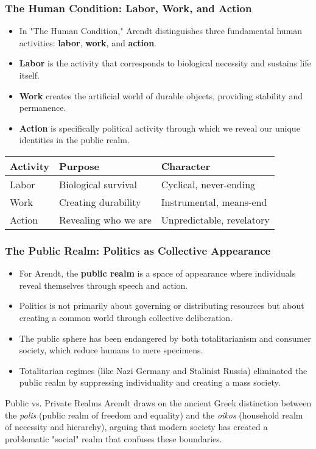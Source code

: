 \documentclass{beamer}
\begin{document}
\begin{frame}
\frametitle{The Human Condition: Labor, Work, and Action}
\begin{itemize}
    \item In "The Human Condition," Arendt distinguishes three fundamental human activities: \textbf{labor}, \textbf{work}, and \textbf{action}.
    \item \textbf{Labor} is the activity that corresponds to biological necessity and sustains life itself.
    \item \textbf{Work} creates the artificial world of durable objects, providing stability and permanence.
    \item \textbf{Action} is specifically political activity through which we reveal our unique identities in the public realm.
\end{itemize}

\begin{center}
\begin{tabular}{lll}
\toprule
\textbf{Activity} & \textbf{Purpose} & \textbf{Character} \\
\midrule
Labor & Biological survival & Cyclical, never-ending \\
Work & Creating durability & Instrumental, means-end \\
Action & Revealing who we are & Unpredictable, revelatory \\
\bottomrule
\end{tabular}
\end{center}
\end{frame}

\begin{frame}
\frametitle{The Public Realm: Politics as Collective Appearance}
\begin{itemize}
    \item For Arendt, the \textbf{public realm} is a space of appearance where individuals reveal themselves through speech and action.
    \item Politics is not primarily about governing or distributing resources but about creating a common world through collective deliberation.
    \item The public sphere has been endangered by both totalitarianism and consumer society, which reduce humans to mere specimens.
    \item Totalitarian regimes (like Nazi Germany and Stalinist Russia) eliminated the public realm by suppressing individuality and creating a mass society.
\end{itemize}

\begin{block}{Public vs. Private Realms}
Arendt draws on the ancient Greek distinction between the \textit{polis} (public realm of freedom and equality) and the \textit{oikos} (household realm of necessity and hierarchy), arguing that modern society has created a problematic "social" realm that confuses these boundaries.
\end{block}
\end{frame}
\end{document}
